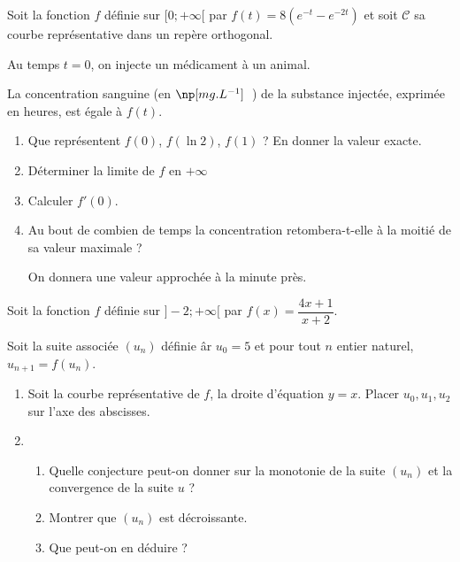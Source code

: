 \begin{question}[topic=exponentielle,class=IG]
  Soit la fonction $f$ définie sur $[0;+\infty[$ par $f(t) = 8(e^{-t} -
  e^{-2t})$ et soit $\mathcal{C}$ sa courbe représentative dans un
  repère orthogonal.

  Au temps $t = 0$, on injecte un médicament à un animal.

  La concentration sanguine (en $\np[mg.L^{-1}]{\phantom{x}}$) de la
  substance injectée, exprimée en heures, est égale à $f(t)$.

  \begin{enumerate}
    \item Que représentent $f(0)$, $f(\ln 2)$, $f(1)$ ? En donner la valeur
      exacte.
    \item Déterminer la limite de $f$ en $+\infty$
    \item Calculer $f'(0)$.
    \item Au bout de combien de temps la concentration retombera-t-elle à la
      moitié de sa valeur maximale ?

      On donnera une valeur approchée à la minute près.
  \end{enumerate}
\end{question}

\begin{question}[topic=suites,class=IG]
  Soit la fonction $f$ définie sur $]-2; +\infty[$ par $f(x) =
  \dfrac{4x+1}{x+2}$.

  Soit la suite associée $(u_n)$ définie âr $u_0 = 5$ et pour tout $n$
  entier naturel, $u_{n+1} = f(u_n)$.

  \begin{enumerate}
    \item Soit la courbe représentative de $f$, la droite d'équation $y =
      x$. Placer $u_0, u_1, u_2$ sur l'axe des abscisses.

      \begin{center}
      \end{center}
    \item
      \begin{enumerate}
        \item Quelle conjecture peut-on donner sur la monotonie de la suite
          $(u_n)$ et la convergence de la suite $u$ ?
        \item Montrer que $(u_n)$ est décroissante.
        \item Que peut-on en déduire ?
      \end{enumerate}
  \end{enumerate}
\end{question}

